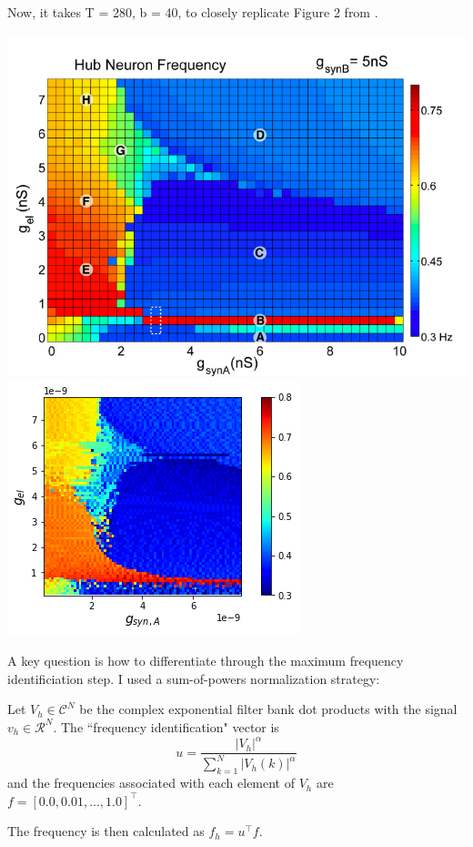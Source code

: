 \documentclass[11pt]{article}
\begin{document}
Now, it takes T = 280, b = 40, to closely replicate Figure 2 from \cite{gutierrez2013multiple}.

\begin{center}
\includegraphics[scale=0.3]{figs/Gutierrez2013_Fig2.png}
\includegraphics[scale=0.6]{figs/Fig2_rep.png}
\end{center}

A key question is how to differentiate through the maximum frequency identificiation step.  I used a sum-of-powers normalization strategy:

Let $V_h \in \mathcal{C}^N$ be the complex exponential filter bank dot products with the signal $v_h \in \mathcal{R}^N$.  The ``frequency identification" vector is 
\[u = \frac{|V_h|^\alpha}{\sum_{k=1}^N |V_h(k)|^\alpha} \] and the frequencies associated with each element of $V_h$ are $f = \left[ 0.0, 0.01, ..., 1.0 \right]^\top$.

The frequency is then calculated as $f_h = u^\top f$.



\end{document}
